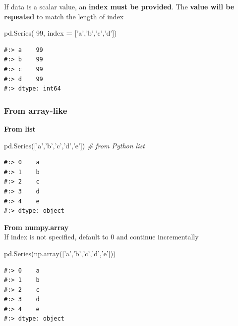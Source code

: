 \documentclass[
]{book}
\newenvironment{Shaded}{\begin{snugshade}}{\end{snugshade}}
\newcommand{\CommentTok}[1]{\textcolor[rgb]{0.37,0.37,0.37}{\textit{#1}}}
\newcommand{\DecValTok}[1]{\textcolor[rgb]{0.06,0.06,0.06}{#1}}
\newcommand{\NormalTok}[1]{#1}
\newcommand{\OperatorTok}[1]{\textcolor[rgb]{0.43,0.43,0.43}{\textbf{#1}}}
\newcommand{\StringTok}[1]{\textcolor[rgb]{0.5,0.5,0.5}{#1}}
\begin{document}
If data is a scalar value, an \textbf{index must be provided}. The \textbf{value will be repeated} to match the length of index

\begin{Shaded}
\begin{Highlighting}[]
\NormalTok{pd.Series( }\DecValTok{99}\NormalTok{, index }\OperatorTok{=}\NormalTok{ [}\StringTok{'a'}\NormalTok{,}\StringTok{'b'}\NormalTok{,}\StringTok{'c'}\NormalTok{,}\StringTok{'d'}\NormalTok{])}
\end{Highlighting}
\end{Shaded}

\begin{verbatim}
#:> a    99
#:> b    99
#:> c    99
#:> d    99
#:> dtype: int64
\end{verbatim}

\hypertarget{from-array-like}{%
\subsubsection{From array-like}\label{from-array-like}}

\textbf{From list}

\begin{Shaded}
\begin{Highlighting}[]
\NormalTok{pd.Series([}\StringTok{'a'}\NormalTok{,}\StringTok{'b'}\NormalTok{,}\StringTok{'c'}\NormalTok{,}\StringTok{'d'}\NormalTok{,}\StringTok{'e'}\NormalTok{])           }\CommentTok{# from Python list}
\end{Highlighting}
\end{Shaded}

\begin{verbatim}
#:> 0    a
#:> 1    b
#:> 2    c
#:> 3    d
#:> 4    e
#:> dtype: object
\end{verbatim}

\textbf{From numpy.array}\\
If index is not specified, default to 0 and continue incrementally

\begin{Shaded}
\begin{Highlighting}[]
\NormalTok{pd.Series(np.array([}\StringTok{'a'}\NormalTok{,}\StringTok{'b'}\NormalTok{,}\StringTok{'c'}\NormalTok{,}\StringTok{'d'}\NormalTok{,}\StringTok{'e'}\NormalTok{]))}
\end{Highlighting}
\end{Shaded}

\begin{verbatim}
#:> 0    a
#:> 1    b
#:> 2    c
#:> 3    d
#:> 4    e
#:> dtype: object
\end{verbatim}
\end{document}
